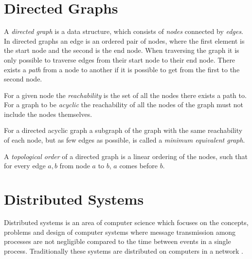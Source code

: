 	
			
	\section{Directed Graphs}
	A \textit{directed graph} is a data structure, which consists of \textit{nodes} connected by \textit{edges}. In directed graphs an edge is an ordered pair of nodes, where the first element is the start node and the second is the end node. When traversing the graph it is only possible to traverse edges from their start node to their end node. There exists a \textit{path} from a node to another if it is possible to get from the first to the second node.
	
	For a given node the \textit{reachability} is the set of all the nodes there exists a path to. For a graph to be \textit{acyclic} the reachability of all the nodes of the graph must not include the nodes themselves. 
	
	For a directed acyclic graph a subgraph of the graph with the same reachability of each node, but as few edges as possible, is called a \textit{minimum equivalent graph}.
	
	A \textit{topological order} of a directed graph is a linear ordering of the nodes, such that for every edge $a,b$ from node $a$ to $b$, $a$ comes before $b$.
	

	\section{Distributed Systems}
		Distributed systems is an area of computer science which focuses on the concepts, problems and design of computer systems where message transmission among processes are not negligible compared to the time between events in a single process. Traditionally these systems are distributed on computers in a network \cite{Coulouris:2011:DSC:2029110}. 
		
